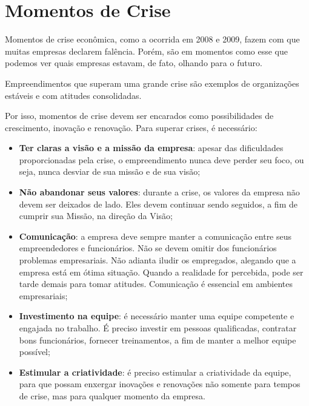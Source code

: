 \documentclass[12pt]{article}
\begin{document}
\section{Momentos de Crise}

Momentos de crise econômica, como a ocorrida em 2008 e 2009, fazem com que muitas empresas declarem falência. Porém, são em momentos
como esse que podemos ver quais empresas estavam, de fato, olhando para o futuro.

Empreendimentos que superam uma grande crise são exemplos de organizações estáveis e com atitudes consolidadas.

Por isso, momentos de crise devem ser encarados como possibilidades de crescimento, inovação e renovação. Para superar crises, é necessário:

\begin{itemize}

	\item \textbf{Ter claras a visão e a missão da empresa}: apesar das dificuldades proporcionadas pela crise, o empreendimento nunca deve
	perder seu foco, ou seja, nunca desviar de sua missão e de sua visão;
	
	\item \textbf{Não abandonar seus valores}: durante a crise, os valores da empresa não devem ser deixados de lado. Eles devem continuar
	sendo seguidos, a fim de cumprir sua Missão, na direção da Visão;
	
	\item \textbf{Comunicação}: a empresa deve sempre manter a comunicação entre seus empreendedores e funcionários. Não se devem omitir
	dos funcionários problemas empresariais. Não adianta iludir os empregados, alegando que a empresa está em ótima situação. Quando a
	realidade for percebida, pode ser tarde demais para tomar atitudes. Comunicação é essencial em ambientes empresariais;
	
	\item \textbf{Investimento na equipe}: é necessário manter uma equipe competente e engajada no trabalho. É preciso investir em pessoas
	qualificadas, contratar bons funcionários, fornecer treinamentos, a fim de manter a melhor equipe possível;
	
	\item \textbf{Estimular a criatividade}: é preciso estimular a criatividade da equipe, para que possam enxergar inovações e renovações
	não somente para tempos de crise, mas para qualquer momento da empresa.

\end{itemize}
\end{document}

